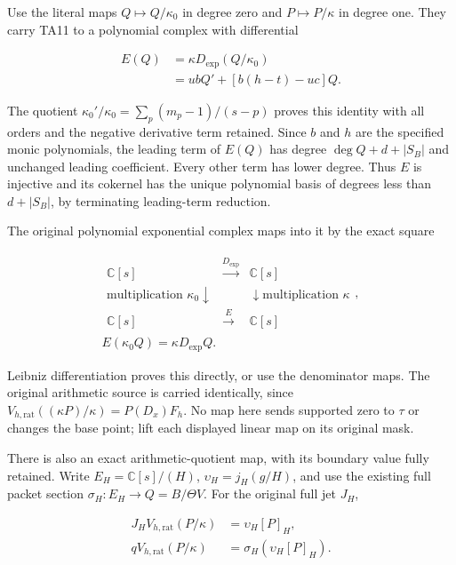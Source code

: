 Use the literal maps \(Q\longmapsto Q/\kappa_0\) in degree zero and \(P\longmapsto P/\kappa\) in
degree one. They carry TA11 to a polynomial complex with differential

\[
\begin{aligned}E(Q)&=\kappa D_{\mathrm{exp}}(Q/\kappa_0)\\&=ubQ'+[b(h-t)-uc]Q.\end{aligned}\tag{TA12}
\]

The quotient \(\kappa_0'/\kappa_0=\sum_p(m_p-1)/(s-p)\) proves this identity with
all orders and the negative derivative term retained. Since \(b\) and \(h\) are the
specified monic polynomials, the leading term of \(E(Q)\) has degree
\(\deg Q+d+|S_B|\) and unchanged leading coefficient. Every other term has lower
degree. Thus \(E\) is injective and its cokernel has the unique polynomial basis
of degrees less than \(d+|S_B|\), by terminating leading-term reduction.

The original polynomial exponential complex maps into it by the exact square

\[
\begin{gathered}\begin{array}{ccc}\mathbb C[s]&\xrightarrow{D_{\mathrm{exp}}}&\mathbb C[s]\\{\scriptstyle\text{multiplication }\kappa_0}\downarrow&&\downarrow{\scriptstyle\text{multiplication }\kappa}\\\mathbb C[s]&\xrightarrow{E}&\mathbb C[s]\end{array},\\E(\kappa_0Q)=\kappa D_{\mathrm{exp}}Q.\end{gathered}\tag{TA13}
\]

Leibniz differentiation proves this directly, or use the denominator maps.
The original arithmetic source is carried identically, since
\(V_{h,\mathrm{rat}}((\kappa P)/\kappa)=P(D_x)F_h\). No map here sends supported zero to \(\tau\)
or changes the base point; lift each displayed linear map on its original mask.

There is also an exact arithmetic-quotient map, with its boundary value fully
retained. Write \(E_H=\mathbb C[s]/(H)\), \(\upsilon_H=j_H(g/H)\), and use the existing full
packet section \(\sigma_H:E_H\longrightarrow Q=B/\Theta V\). For the original full jet \(J_H\),

\[
\begin{aligned}J_HV_{h,\mathrm{rat}}(P/\kappa)&=\upsilon_H[P]_H,\\qV_{h,\mathrm{rat}}(P/\kappa)&=\sigma_H(\upsilon_H[P]_H).\end{aligned}\tag{TA14}
\]

